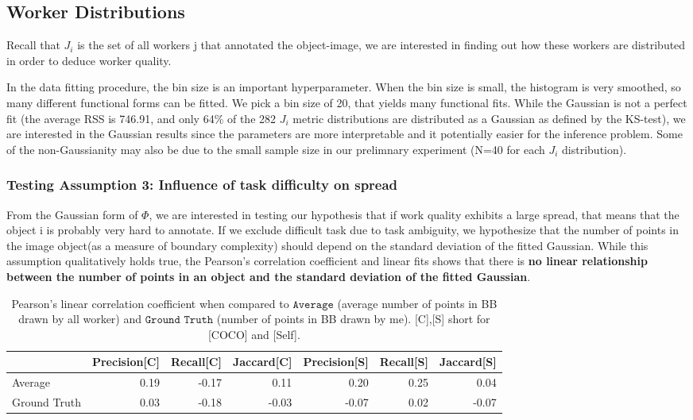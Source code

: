 \documentclass[12pt]{article}
\begin{document}
\subsection{Worker Distributions}
\par Recall that $J_i$  is the set of all workers j that annotated the object-image, we are interested in finding out how these workers are distributed in order to deduce worker quality. 
\par In the data fitting procedure, the bin size is an important hyperparameter. When the bin size is small, the histogram is very smoothed, so many different functional forms can be fitted. We pick a bin size of 20, that yields many functional fits. While the Gaussian is not a perfect fit (the average RSS  is 746.91, and only 64\% of the 282 $J_i$ metric distributions are distributed as a Gaussian as defined by the KS-test), we are interested in the Gaussian results since the parameters are more interpretable and it potentially easier for the inference problem. Some of the non-Gaussianity may also be due to the small sample size in our prelimnary experiment (N=40 for each $J_i$ distribution).
\subsubsection{Testing Assumption 3: Influence of task difficulty on spread}
\par From the Gaussian form of $\Phi$, we are interested in testing our hypothesis that if work quality exhibits a large spread, that means that the object i is probably very hard to annotate. If we exclude difficult task due to task ambiguity, we hypothesize that the number of points in the image object(as a measure of boundary complexity) should depend on the standard deviation of the fitted Gaussian. While this assumption qualitatively holds true, the Pearson's correlation coefficient and linear fits shows that there is \textbf{no linear relationship between the number of points in an object and the standard deviation of the fitted Gaussian}.

\begin{table}[h]
\centering
\begin{tabular}{lrrrrrr}
\hline
                              &   Precision[C] &   Recall[C] &   Jaccard[C] &   Precision[S] &   Recall[S] &   Jaccard[S] \\
\hline
 Average             &   0.19 &  -0.17 &   0.11 &   0.20 &   0.25 &   0.04 \\
Ground Truth &   0.03 &  -0.18 &  -0.03 &  -0.07 &   0.02 &  -0.07 \\
\hline
\end{tabular}
\caption{Pearson's linear correlation coefficient when compared to $\texttt{Average}$ (average number of points in BB drawn by all worker) and  $\texttt{Ground Truth}$ (number of points in BB drawn by me). [C],[S] short for [COCO] and [Self].}
\end{table}
\end{document}
